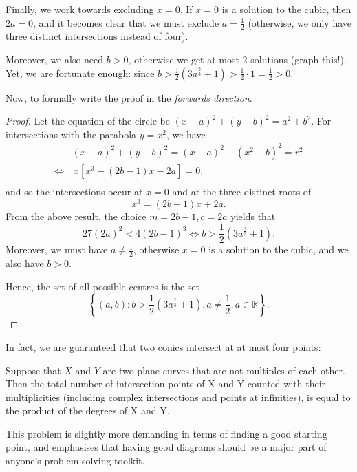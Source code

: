 \documentclass[../main.tex]{subfiles}
\begin{document}
Finally, we work towards excluding $x=0$. If $x=0$ is a solution to the cubic, then $2a=0$, and it becomes clear that we must exclude $a=\frac{1}{2}$ (otherwise, we only have three distinct intersections instead of four).

Moreover, we also need $b > 0$, otherwise we get at most 2 solutions (graph this!). Yet, we are fortunate enough: since $b > \frac{1}{2}\left(3a^{\frac{2}{3}}+1\right) > \frac{1}{2}\cdot 1 = \frac{1}{2} > 0$.

Now, to formally write the proof in the \textit{forwards direction}.
\begin{proof}
Let the equation of the circle be $(x-a)^2+(y-b)^2=a^2+b^2$.
For intersections with the parabola $y=x^2$, we have
\begin{align*}
    &(x-a)^2+(y-b)^2 =(x-a)^2+(x^2-b)^2=r^2 \\
    \Longleftrightarrow& \,x\left[x^3-(2b-1)x-2a\right]=0,\\
\end{align*}
and so the intersections occur at $x=0$ and at the three distinct roots of 
$$x^3=(2b-1)x+2a.$$
From the above result, the choice $m=2b-1, c=2a$ yields that $$27(2a)^2 < 4(2b-1)^3 \Longleftrightarrow b > \frac{1}{2}\left(3a^{\frac{2}{3}}+1\right).$$
Moreover, we must have $a \neq \frac{1}{2}$, otherwise $x=0$ is a solution to the cubic, and we also have $b > 0$. 

Hence, the set of all possible centres is the set 
$$\left\{(a,b): b > \frac{1}{2}\left(3a^{\frac{2}{3}}+1\right), a\neq \frac{1}{2}, a \in \mathbb{R}\right\}.$$
\end{proof}

In fact, we are guaranteed that two conics intersect at at most four points:
\begin{theorem}
Suppose that $X$ and $Y$ are two plane curves that are not multiples of each other. Then the total number of intersection points of X and Y counted with their multiplicities (including complex intersections and points at infinities), is equal to the product of the degrees of X and Y.
\end{theorem}

\begin{moral}
This problem is slightly more demanding in terms of finding a good starting point, and emphasises that having good diagrams should be a major part of anyone's problem solving toolkit.
\end{moral}
\end{document}
